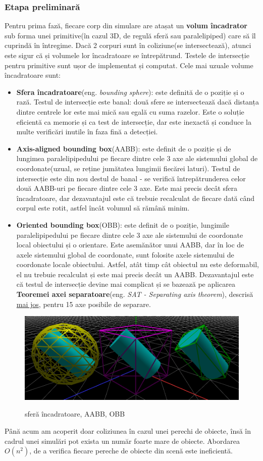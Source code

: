 \documentclass[12pt,a4paper]{report}
\begin{document}
\subsubsection{Etapa preliminară}
Pentru prima fază, fiecare corp din simulare are atașat un \textbf{volum încadrator} sub forma unei primitive(în cazul 3D, de regulă sferă sau paralelipiped) care să îl cuprindă în întregime. Dacă 2 corpuri sunt în coliziune(se intersectează), atunci este sigur că și volumele lor încadratoare se întrepătrund. Testele de intersecție pentru primitive sunt ușor de implementat și computat.
Cele mai uzuale volume încadratoare sunt:
\begin{itemize}
	\item \textbf{Sfera încadratoare}(eng. \textit{bounding sphere}): este definită de o poziție și o rază. Testul de intersecție este banal: două sfere se intersectează dacă distanța dintre centrele lor este mai mică sau egală cu suma razelor. Este o soluție eficientă ca memorie și ca test de intersecție, dar este inexactă și conduce la multe verificări inutile în faza fină a detecției.
	\item \textbf{Axis-aligned bounding box}(AABB): este definit de o poziție și de lungimea paralelipipedului pe fiecare dintre cele 3 axe ale sistemului global de coordonate(uzual, se reține jumătatea lungimii fiecărei laturi). Testul de intersecție este din nou destul de banal - se verifică întrepătrunderea celor două AABB-uri pe fiecare dintre cele 3 axe. Este mai precis decât sfera încadratoare, dar dezavantajul este că trebuie recalculat de fiecare dată când corpul este rotit, astfel încât volumul să rămână minim.
	\item \textbf{Oriented bounding box}(OBB): este definit de o poziție, lungimile paralelipipedului pe fiecare dintre cele 3 axe ale sistemului de coordonate local obiectului și o orientare. Este asemănător unui AABB, dar în loc de axele sistemului global de coordonate, sunt folosite axele sistemului de coordonate locale obiectului. Astfel, atât timp cât obiectul nu este deformabil, el nu trebuie recalculat și este mai precis decât un AABB. Dezavantajul este că testul de intersecție devine mai complicat și se bazează pe aplicarea \textbf{Teoremei axei separatoare}(eng. \textit{SAT - Separating axis theorem}), descrisă \hyperref[SAT]{mai jos}, pentru 15 axe posibile de separare.
\end{itemize}
\begin{figure}[H]
	\centering
	\includegraphics[width=0.7\linewidth]{pics/cap3_00.png}
	\label{fig:cap3_00}
	\caption[volume încadratoare uzuale]{sferă încadratoare, AABB, OBB}
\end{figure}
Până acum am acoperit doar coliziunea în cazul unei perechi de obiecte, însă în cadrul unei simulări pot exista un număr foarte mare de obiecte. Abordarea $O(n^2)$, de a verifica fiecare pereche de obiecte din scenă este ineficientă.
\end{document}

